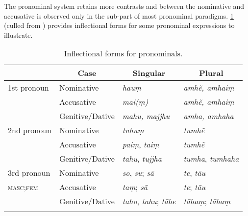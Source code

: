 \documentclass[output=paper,
modfonts
]{LSP/langsci}
\begin{document}
The pronominal system retains more contrasts and  between the nominative and accusative is observed only in the  sub-part of most pronominal paradigms. \cref{tab:pron} (culled from \citealt{declercq2010}) provides inflectional forms for some pronominal expressions to illustrate.



\begin{table}
\begin{tabular}[t]{llll}
\lsptoprule
\multicolumn{1}{c}{Stem} & \multicolumn{1}{c}{Case} & \multicolumn{1}{c}{Singular} & \multicolumn{1}{c}{Plural} \\
\midrule
 1st pronoun & Nominative  & \textit{hauṃ} &  \textit{amhẽ, amhaiṃ} \\
 & Accusative& \textit{mai(ṃ)} & \textit{amhẽ, amhaiṃ} \\ 
 & Genitive/Dative& \textit{mahu, majjhu} & \textit{amha, amhaha} \\[2ex]
 2nd pronoun & Nominative  & \textit{tuhuṃ} & \textit{tumhẽ} \\ 
 & Accusative  & \textit{paiṃ}, \textit{taiṃ} & \textit{tumhẽ}\\
 & Genitive/Dative & \textit{tahu}, \textit{tujjha} & \textit{tumha}, \textit{tumhaha} \\[2ex]
 3rd pronoun  & Nominative &  \textit{so}, \textit{su}; \textit{sā} & \textit{te}, \textit{tāu}  \\
\textsc{masc;fem} & Accusative & \textit{taṃ}; \textit{sā} &  \textit{te};  \textit{tāu} \\
  & Genitive/Dative & \textit{taho}, \textit{tahu}; \textit{tāhe} & \textit{tāhaṃ}; \textit{tāhaṃ} \\
 \lspbottomrule
\end{tabular}
\caption{Inflectional forms for pronominals.}
\label{tab:pron}
\end{table}
\end{document}
